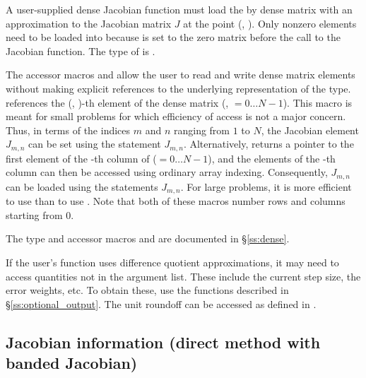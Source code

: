 {
  A user-supplied dense Jacobian function must load the  by 
  dense matrix  with an approximation to the Jacobian matrix $J$
  at the point (, ).  Only nonzero elements need to be loaded
  into  because  is set to the zero matrix before the call
  to the Jacobian function. The type of  is . 
  
  The accessor macros  and  allow the user to
  read and write dense matrix elements without making explicit
  references to the underlying representation of the 
  type.  references the (, )-th
  element of the dense matrix  (, $= 0\ldots N-1$). This macro
  is meant for small problems for which efficiency of access is not a major
  concern.  Thus, in terms of the indices $m$ and $n$ ranging from $1$ to
  $N$, the Jacobian element $J_{m,n}$ can be set using the statement
   $J_{m,n}$.  Alternatively,
   returns a pointer to the first element of
  the -th column of  ($= 0\ldots N-1$), and the 
  elements of the -th column
  can then be accessed using ordinary array indexing.  Consequently, $J_{m,n}$ can be 
  loaded using the statements 
   $J_{m,n}$.  For large problems, it is more 
  efficient to use  than to use . 
  Note that both of these macros number rows and columns
  starting from $0$.  

  The  type and accessor macros  and 
   are documented in \S\ref{ss:dense}.

  If the user's  function uses difference quotient
  approximations, it may need to access quantities not in the argument
  list. These include the current step size, the error weights, etc.
  To obtain these, use the  functions described in
  \S\ref{ss:optional_output}. The unit roundoff can be accessed
  as  defined in .
}

\subsection{Jacobian information (direct method with banded Jacobian)}
\label{ss:bjacFn}

